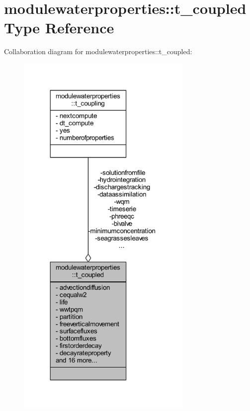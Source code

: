\hypertarget{structmodulewaterproperties_1_1t__coupled}{}\section{modulewaterproperties\+:\+:t\+\_\+coupled Type Reference}
\label{structmodulewaterproperties_1_1t__coupled}


Collaboration diagram for modulewaterproperties\+:\+:t\+\_\+coupled\+:\nopagebreak
\begin{figure}[H]
\begin{center}
\leavevmode
\includegraphics[width=239pt]{structmodulewaterproperties_1_1t__coupled__coll__graph}
\end{center}
\end{figure}
